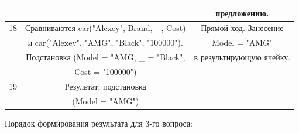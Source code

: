 \documentclass[12pt]{report}
\begin{document}
\begin{table}[H]
\begin{center}
\begin{tabular}{|c c c |}
			&  & предложению. \\
			\hline
			18 & Сравниваются car("Alexey"{}, Brand, \_, Cost) & Прямой ход. Занесение \\
			& и car("Alexey"{}, "AMG"{}, "Black"{}, "100000"{}). & Model = "AMG"{} \\
			& Подстановка (Model = "AMG, \_ = "Black",  & в результирующую ячейку. \\
			& Cost = "100000")  & \\
			\hline
			19 & Результат: подстановка & \\
			& (Model = "AMG"{}) & \\
			\hline
		\end{tabular}
	\end{center}
\end{table}


Порядок формирования результата для 3-го вопроса:
\end{document}
